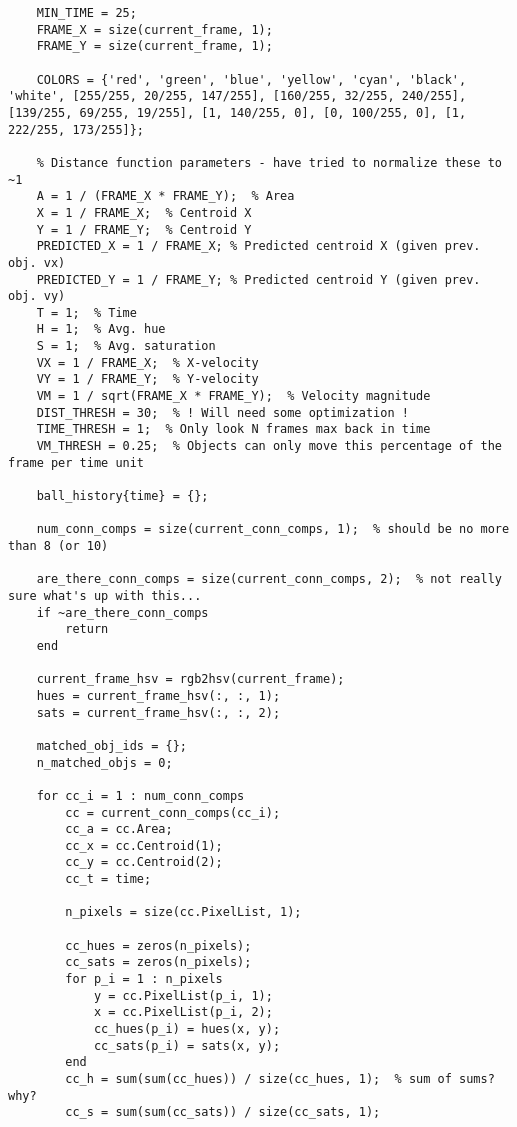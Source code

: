 \documentclass[12pt,a4paper]{article}
\begin{document}
\begin{appendices}
\begin{verbatim}
    MIN_TIME = 25;
    FRAME_X = size(current_frame, 1);
    FRAME_Y = size(current_frame, 1);
    
    COLORS = {'red', 'green', 'blue', 'yellow', 'cyan', 'black', 'white', [255/255, 20/255, 147/255], [160/255, 32/255, 240/255], [139/255, 69/255, 19/255], [1, 140/255, 0], [0, 100/255, 0], [1, 222/255, 173/255]};
    
    % Distance function parameters - have tried to normalize these to ~1 
    A = 1 / (FRAME_X * FRAME_Y);  % Area
    X = 1 / FRAME_X;  % Centroid X
    Y = 1 / FRAME_Y;  % Centroid Y
    PREDICTED_X = 1 / FRAME_X; % Predicted centroid X (given prev. obj. vx)
    PREDICTED_Y = 1 / FRAME_Y; % Predicted centroid Y (given prev. obj. vy)
    T = 1;  % Time
    H = 1;  % Avg. hue
    S = 1;  % Avg. saturation
    VX = 1 / FRAME_X;  % X-velocity
    VY = 1 / FRAME_Y;  % Y-velocity
    VM = 1 / sqrt(FRAME_X * FRAME_Y);  % Velocity magnitude
    DIST_THRESH = 30;  % ! Will need some optimization !
    TIME_THRESH = 1;  % Only look N frames max back in time
    VM_THRESH = 0.25;  % Objects can only move this percentage of the frame per time unit
    
    ball_history{time} = {};
    
    num_conn_comps = size(current_conn_comps, 1);  % should be no more than 8 (or 10)
    
    are_there_conn_comps = size(current_conn_comps, 2);  % not really sure what's up with this... 
    if ~are_there_conn_comps
        return
    end
    
    current_frame_hsv = rgb2hsv(current_frame);
    hues = current_frame_hsv(:, :, 1);
    sats = current_frame_hsv(:, :, 2);
    
    matched_obj_ids = {};
    n_matched_objs = 0;
    
    for cc_i = 1 : num_conn_comps
        cc = current_conn_comps(cc_i);
        cc_a = cc.Area;
        cc_x = cc.Centroid(1);
        cc_y = cc.Centroid(2);
        cc_t = time;
        
        n_pixels = size(cc.PixelList, 1);
        
        cc_hues = zeros(n_pixels);
        cc_sats = zeros(n_pixels);
        for p_i = 1 : n_pixels
            y = cc.PixelList(p_i, 1);
            x = cc.PixelList(p_i, 2);
            cc_hues(p_i) = hues(x, y);
            cc_sats(p_i) = sats(x, y);
        end
        cc_h = sum(sum(cc_hues)) / size(cc_hues, 1);  % sum of sums? why?
        cc_s = sum(sum(cc_sats)) / size(cc_sats, 1);
                

\end{verbatim}
\end{appendices}
\end{document}
